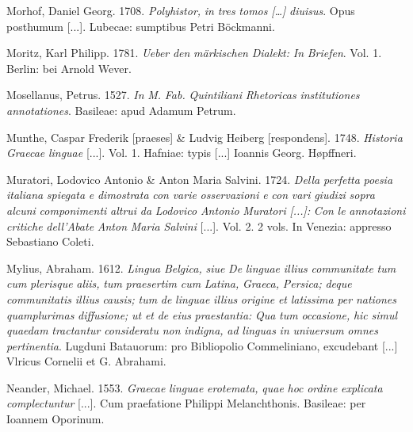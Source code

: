 Morhof, Daniel Georg. 1708. \textit{Polyhistor,} \textit{in} \textit{tres} \textit{tomos} \textit{[…]} \textit{diuisus}. Opus posthumum [...]. Lubecae: sumptibus Petri Böckmanni.

Moritz, Karl Philipp. 1781. \textit{Ueber} \textit{den} \textit{märkischen} \textit{Dialekt:} \textit{In} \textit{Briefen}. Vol. 1. Berlin: bei Arnold Wever.

Mosellanus, Petrus. 1527. \textit{In} \textit{M.} \textit{Fab.} \textit{Quintiliani} \textit{Rhetoricas} \textit{institutiones} \textit{annotationes}. Basileae: apud Adamum Petrum.

Munthe, Caspar Frederik [praeses] \& Ludvig Heiberg [respondens]. 1748. \textit{Historia} \textit{Graecae} \textit{linguae} [...]. Vol. 1. Hafniae: typis [...] Ioannis Georg. Høpffneri.

Muratori, Lodovico Antonio \& Anton Maria Salvini. 1724. \textit{Della} \textit{perfetta} \textit{poesia} \textit{italiana} \textit{spiegata} \textit{e} \textit{dimostrata} \textit{con} \textit{varie} \textit{osservazioni} \textit{e} \textit{con} \textit{vari} \textit{giudizi} \textit{sopra} \textit{alcuni} \textit{componimenti} \textit{altrui} \textit{da} \textit{Lodovico} \textit{Antonio} \textit{Muratori} \textit{[...]:} \textit{Con} \textit{le} \textit{annotazioni} \textit{critiche} \textit{dell’Abate} \textit{Anton} \textit{Maria} \textit{Salvini} [...]. Vol. 2. 2 vols. In Venezia: appresso Sebastiano Coleti.

Mylius, Abraham. 1612. \textit{Lingua} \textit{Belgica,} \textit{siue} \textit{De} \textit{linguae} \textit{illius} \textit{communitate} \textit{tum} \textit{cum} \textit{plerisque} \textit{aliis,} \textit{tum} \textit{praesertim} \textit{cum} \textit{Latina,} \textit{Graeca,} \textit{Persica;} \textit{deque} \textit{communitatis} \textit{illius} \textit{causis;} \textit{tum} \textit{de} \textit{linguae} \textit{illius} \textit{origine} \textit{et} \textit{latissima} \textit{per} \textit{nationes} \textit{quamplurimas} \textit{diffusione;} \textit{ut} \textit{et} \textit{de} \textit{eius} \textit{praestantia:} \textit{Qua} \textit{tum} \textit{occasione,} \textit{hic} \textit{simul} \textit{quaedam} \textit{tractantur} \textit{consideratu} \textit{non} \textit{indigna,} \textit{ad} \textit{linguas} \textit{in} \textit{uniuersum} \textit{omnes} \textit{pertinentia}. Lugduni Batauorum: pro Bibliopolio Commeliniano, excudebant [...] Vlricus Cornelii et G. Abrahami.

Neander, Michael. 1553. \textit{Graecae} \textit{linguae} \textit{erotemata,} \textit{quae} \textit{hoc} \textit{ordine} \textit{explicata} \textit{complectuntur} [...]. Cum praefatione Philippi Melanchthonis. Basileae: per Ioannem Oporinum.

